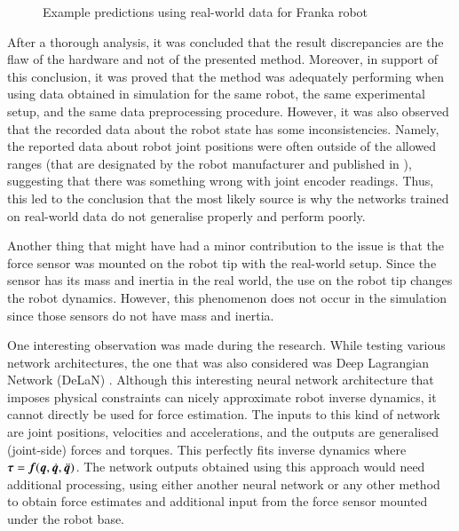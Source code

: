 \begin{figure}
    \hfil
    \caption{Example predictions using real-world data for Franka robot}
    \label{fig:RealGraphs}
\end{figure}

After a thorough analysis, it was concluded that the result discrepancies are the flaw of the hardware and not of the presented method. Moreover, in support of this conclusion, it was proved that the method was adequately performing when using data obtained in simulation for the same robot, the same experimental setup, and the same data preprocessing procedure. However, it was also observed that the recorded data about the robot state has some inconsistencies. Namely, the reported data about robot joint positions were often outside of the allowed ranges (that are designated by the robot manufacturer and published in \cite{FrankaRobot}), suggesting that there was something wrong with joint encoder readings. Thus, this led to the conclusion that the most likely source is why the networks trained on real-world data do not generalise properly and perform poorly. 

Another thing that might have had a minor contribution to the issue is that the force sensor was mounted on the robot tip with the real-world setup. Since the sensor has its mass and inertia in the real world, the use on the robot tip changes the robot dynamics. However, this phenomenon does not occur in the simulation since those sensors do not have mass and inertia. 

One interesting observation was made during the research. While testing various network architectures, the one that was also considered was Deep Lagrangian Network (DeLaN) \cite{Lutter2019}. Although this interesting neural network architecture that imposes physical constraints can nicely approximate robot inverse dynamics, it cannot directly be used for force estimation. The inputs to this kind of network are joint positions, velocities and accelerations, and the outputs are generalised (joint-side) forces and torques. This perfectly fits inverse dynamics where ${\bm{\tau}}={\bm{f}}({\bm{q}},\dot{{\bm{q}}},\ddot{{\bm{q}}})$. The network outputs obtained using this approach would need additional processing, using either another neural network or any other method to obtain force estimates and additional input from the force sensor mounted under the robot base. 

